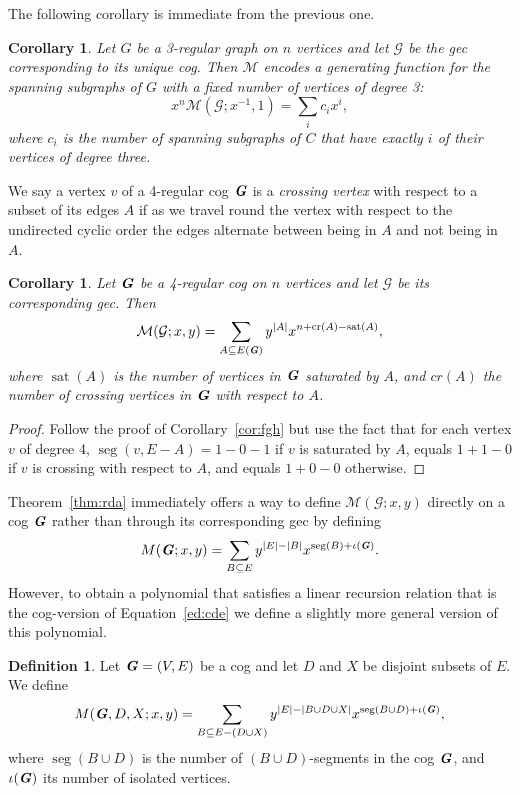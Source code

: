 \documentclass{amsart}
\newcommand{\gec}[1]{\mathcal{#1}}
\newcommand{\calM}{\mathcal{M}}
\newcommand{\cog}[1]{\textbf{\textit #1}}
\DeclareMathOperator{\seg}{seg}
\DeclareMathOperator{\sat}{sat}
\DeclareMathOperator{\cro}{cr}
\newtheorem{corollary}[theorem]{Corollary}
\theoremstyle{definition}
\newtheorem{definition}[theorem]{Definition}
\theoremstyle{remark}
\numberwithin{equation}{section}
\begin{document}
The following corollary is immediate from the previous one.
\begin{corollary}  Let $G$ be a 3-regular graph on $n$ vertices and let  $\gec{G}$ be the gec corresponding to its unique cog.
Then $\calM$ encodes a generating function for the spanning subgraphs of $G$ with a fixed number of vertices of degree 3:
\begin{equation}
    x^n\calM(\gec{G};x^{-1}, 1) = \sum_i{ c_i x^i},
\end{equation}
  where $c_i$ is the number of spanning subgraphs of $C$ that have exactly $i$ of their vertices of degree three.  
\end{corollary}



 We say a vertex $v$ of a 4-regular cog $\cog{G}$ is a \emph{crossing vertex} with respect to a subset of its edges $A$ if as we travel round the vertex with respect to the undirected cyclic order the edges alternate between being in $A$ and not being in $A$.

\begin{corollary}
Let $\cog{G}$ be a 4-regular cog on $n$ vertices and let $\gec{G}$ be its corresponding gec. Then 
\[    \calM(\gec{G};x, y) = \sum_{A\subseteq E(\cog{G})} y^{|A|} x^{n+\cro(A)-\sat(A)} ,\] 
where $\sat(A)$ is the number of vertices in $\cog{G}$ saturated by $A$, and  $cr(A)$ the number of crossing vertices in $\cog{G}$ with respect to $A$.
\end{corollary}
\begin{proof}
Follow the proof of Corollary~\ref{cor:fgh} but use the fact that for each vertex $v$ of degree 4, $\seg(v, E-A) = 1-0-1$ if $v$ is saturated by $A$,  equals $1+1-0$ if $v$ is crossing with respect to $A$, and equals $1+0-0$ otherwise.
\end{proof}


Theorem~\ref{thm:rda} immediately offers a way to define $\calM(\gec{G};x, y)$ directly on a cog $\cog{G}$ rather than through its corresponding gec by defining \[M(\cog{G};x, y) = \sum_{B\subseteq E}   y^{|E|-|B|} x^{\seg(B)+\iota(\cog{G})}.\] However, to obtain a polynomial that satisfies a linear recursion relation that is the cog-version of Equation~\eqref{ed:cde} we define a slightly more general version of this polynomial.   

\begin{definition}
Let $\cog{G}=(V,E)$ be a cog and let $D$ and $X$ be disjoint subsets of $E$. We define
\[M(\cog{G},D,X;x, y) = \sum_{B\subseteq E-(D\cup X)}   y^{|E|-|B\cup D\cup X|} x^{\seg(B\cup D)+\iota(\cog{G})},\]
where $\seg(B\cup D)$ is the number of $(B\cup D)$-segments in the cog $\cog{G}$, and $\iota(\cog{G})$ its number of isolated vertices.
\end{definition}
\end{document}

